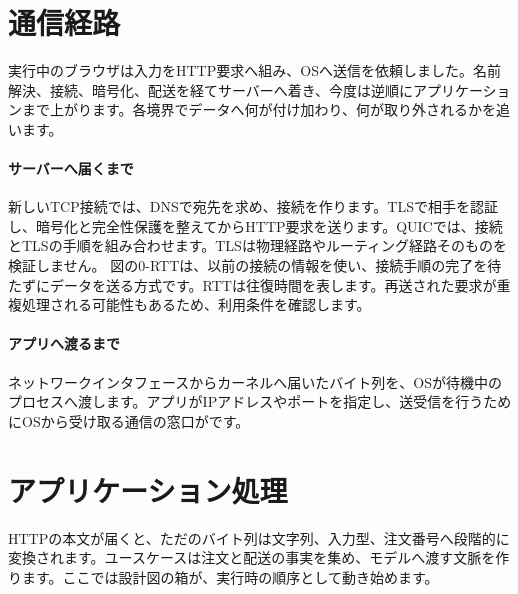 \section{通信経路}
\label{sec:07-practice-03}

実行中のブラウザは入力をHTTP要求へ組み、OSへ送信を依頼しました。名前解決、接続、暗号化、配送を経てサーバーへ着き、今度は逆順にアプリケーションまで上がります。各境界でデータへ何が付け加わり、何が取り外されるかを追います。

\begingroup
  \centering
\begingroup
\paragraph{サーバーへ届くまで}
        新しいTCP接続では、DNSで宛先を求め、接続を作ります。TLSで相手を認証し、暗号化と完全性保護を整えてからHTTP要求を送ります。QUICでは、接続とTLSの手順を組み合わせます。TLSは物理経路やルーティング経路そのものを検証しません。
        図の0-RTTは、以前の接続の情報を使い、接続手順の完了を待たずにデータを送る方式です。RTTは往復時間を表します。再送された要求が重複処理される可能性もあるため、利用条件を確認します。

\par
\endgroup
\medskip
\begingroup
\paragraph{アプリへ渡るまで}
        ネットワークインタフェースからカーネルへ届いたバイト列を、OSが待機中のプロセスへ渡します。アプリがIPアドレスやポートを指定し、送受信を行うためにOSから受け取る通信の窓口がです。

\par
\endgroup
\par
\endgroup


\section{アプリケーション処理}
\label{sec:07-practice-04}

HTTPの本文が届くと、ただのバイト列は文字列、入力型、注文番号へ段階的に変換されます。ユースケースは注文と配送の事実を集め、モデルへ渡す文脈を作ります。ここでは設計図の箱が、実行時の順序として動き始めます。

\begingroup
  \centering
  \vspace{5mm}
\begingroup
